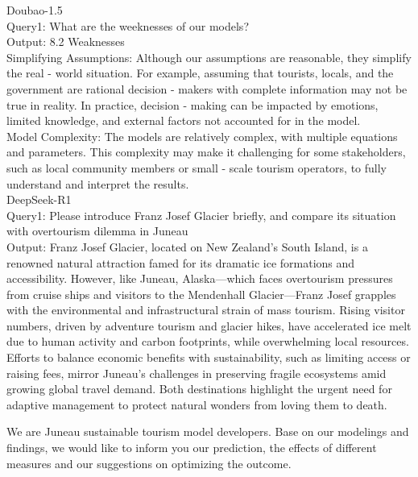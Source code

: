 \documentclass{mcmthesis}
\begin{document}
\begin{appendices}

\AImatter

\begin{ReportAiUse}{9}
Doubao-1.5 \\
Query1: What are the weeknesses of our models? \\
Output: 
8.2 Weaknesses \\
Simplifying Assumptions: Although our assumptions are reasonable, they simplify the real - world situation. For example, assuming that tourists, locals, and the government are rational decision - makers with complete information may not be true in reality. In practice, decision - making can be impacted by emotions, limited knowledge, and external factors not accounted for in the model. \\
Model Complexity: The models are relatively complex, with multiple equations and parameters. This complexity may make it challenging for some stakeholders, such as local community members or small - scale tourism operators, to fully understand and interpret the results. \\

DeepSeek-R1 \\
Query1: Please introduce Franz Josef Glacier briefly, and compare its situation with overtourism dilemma in Juneau \\
Output: 
Franz Josef Glacier, located on New Zealand's South Island, is a renowned natural attraction famed for its dramatic ice formations and accessibility. 
However, like Juneau, Alaska—which faces overtourism pressures from cruise ships and visitors to the Mendenhall Glacier—Franz Josef grapples with the environmental and infrastructural strain of mass tourism. 
Rising visitor numbers, driven by adventure tourism and glacier hikes, have accelerated ice melt due to human activity and carbon footprints, while overwhelming local resources. 
Efforts to balance economic benefits with sustainability, such as limiting access or raising fees, mirror Juneau’s challenges in preserving fragile ecosystems amid growing global travel demand. 
Both destinations highlight the urgent need for adaptive management to protect natural wonders from loving them to death.

\end{ReportAiUse}

\memodate{\today}
\begin{memo}[Memorandum]
  We are Juneau sustainable tourism model developers. Base on our modelings and findings, we would like
  to inform you our prediction, the effects of different measures and our suggestions on optimizing the outcome.


\end{memo}
\end{appendices}
\end{document}
